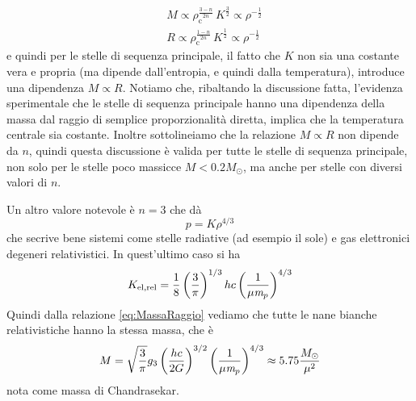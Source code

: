 \begin{align*}
& M \propto \rho_\mathrm{c}^\frac{3-n}{2n} \, K^\frac{3}{2} \propto \rho^{-\frac{1}{2}} \\
& R \propto \rho_\mathrm{c}^\frac{1-n}{2n} \, K^\frac{1}{2} \propto \rho^{-\frac{1}{2}} 
\end{align*}
e quindi per le stelle di sequenza principale, il fatto che $K$ non sia una costante vera e propria (ma dipende dall'entropia, e quindi dalla temperatura), introduce una dipendenza $M\propto R$. Notiamo che, ribaltando la discussione fatta, l'evidenza sperimentale che le stelle di sequenza principale hanno una dipendenza della massa dal raggio di semplice proporzionalità diretta, implica che la temperatura centrale sia costante. Inoltre sottolineiamo che la relazione $M\propto R$ non dipende da $n$, quindi questa discussione è valida per tutte le stelle di sequenza principale, non solo per le stelle poco massicce $M<0.2 M_\odot$, ma anche per stelle con diversi valori di $n$.

Un altro valore notevole è $n=3$ che dà
\begin{equation}
p=K \rho^{4/3} \label{eq:PolitropicaRadiativa}
\end{equation}
che secrive bene sistemi come stelle radiative (ad esempio il sole) e gas elettronici degeneri relativistici. In quest'ultimo caso si ha
\begin{equation}
K_\mathrm{el, rel} = \frac{1}{8}\left( \frac{3}{\pi} \right)^{1/3} hc \left( \frac{1}{\mu \textit{m}_{p}} \right) ^{4/3}
\end{equation}
Quindi dalla relazione \ref{eq:MassaRaggio} vediamo che tutte le nane bianche relativistiche hanno la stessa massa, che è
\begin{equation}
M = \sqrt{\frac{3}{\pi}} g_3 \left( \frac{hc}{2G} \right) ^{3/2} \left( \frac{1}{\mu \textit{m}_{p}} \right)^{4/3} \approx 5.75 \frac{M_\odot}{\mu^2}
\end{equation}
nota come massa di Chandrasekar.


